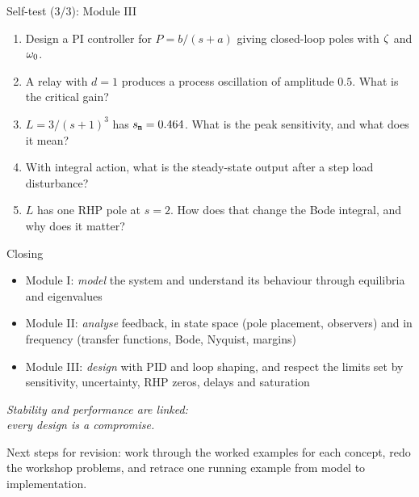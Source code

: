 \documentclass[10pt]{beamer-control}
\begin{document}
\begin{frame}{Self-test (3/3): Module III}
  \footnotesize
  \begin{enumerate}
    \item Design a PI controller for $P = b/(s+a)$ giving closed-loop poles with $\zeta$ and $\omega_0$.
    \item A relay with $d=1$ produces a process oscillation of amplitude $0.5$. What is the critical gain?
    \item $L = 3/(s+1)^3$ has $s_{\texttt{m}} = 0.464$. What is the peak sensitivity, and what does it mean?
    \item With integral action, what is the steady-state output after a step load disturbance?
    \item $L$ has one RHP pole at $s=2$. How does that change the Bode integral, and why does it matter?
  \end{enumerate}
\end{frame}

\begin{frame}{Closing}
  \begin{itemize}
    \item Module I: \emph{model} the system and understand its behaviour through equilibria and eigenvalues
    \item Module II: \emph{analyse} feedback, in state space (pole placement, observers) and in frequency (transfer functions, Bode, Nyquist, margins)
    \item Module III: \emph{design} with PID and loop shaping, and respect the limits set by sensitivity, uncertainty, RHP zeros, delays and saturation
  \end{itemize}
  \bigskip
  \begin{center}
    \emph{Stability and performance are linked:\\ every design is a compromise.}
  \end{center}
  \bigskip
  \footnotesize
  Next steps for revision: work through the worked examples for each concept, redo the workshop problems, and retrace one running example from model to implementation.
\end{frame}
\end{document}
